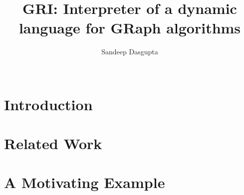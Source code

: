 \documentclass{sig-alternate}
\begin{document}
\title{GRI: Interpreter of a dynamic language for GRaph algorithms}

%
\author{
\alignauthor Sandeep Dasgupta\\ \\  } \date{}

\maketitle 




\section{Introduction}



\section{Related Work}\label{sec:bgrel}


\section{A Motivating Example}\label{sec:motiv}



  
\end{document}
